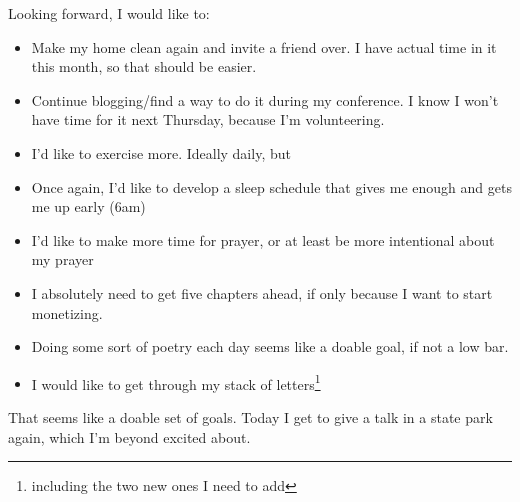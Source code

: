 \documentclass[12pt]{article}[titlepage]
\renewcommand{\,}{\textsuperscript{,}}
\begin{document}
Looking forward, I would like to:
\begin{itemize}
\item Make my home clean again and invite a friend over. I have actual time in it this month, so that should be easier.
\item Continue blogging/find a way to do it during my conference. I know I won't have time for it next Thursday, because I'm volunteering.
\item I'd like to exercise more. Ideally daily, but
\item Once again, I'd like to develop a sleep schedule that gives me enough and gets me up early (6am)
\item I'd like to make more time for prayer, or at least be more intentional about my prayer
\item I absolutely need to get five chapters ahead, if only because I want to start monetizing.
\item Doing some sort of poetry each day seems like a doable goal, if not a low bar.
\item I would like to get through my stack of letters\footnote{including the two new ones I need to add}
\end{itemize}

That seems like a doable set of goals.
Today I get to give a talk in a state park again, which I'm beyond excited about.
\end{document}
